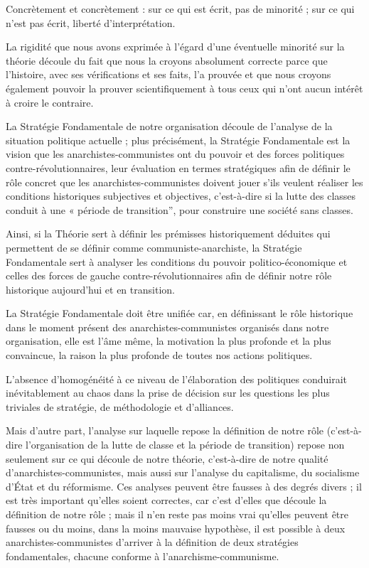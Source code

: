 Concrètement et concrètement : sur ce qui est écrit, pas de minorité ; sur ce qui n'est pas écrit, liberté d'interprétation.

La rigidité que nous avons exprimée à l'égard d'une éventuelle minorité sur la théorie découle du fait que nous la croyons absolument correcte parce que l'histoire, avec ses vérifications et ses faits, l'a prouvée et que nous croyons également pouvoir la prouver scientifiquement à tous ceux qui n'ont aucun intérêt à croire le contraire.

La Stratégie Fondamentale de notre organisation découle de l'analyse de la situation politique actuelle ; plus précisément, la Stratégie Fondamentale est la vision que les anarchistes-communistes ont du pouvoir et des forces politiques contre-révolutionnaires, leur évaluation en termes stratégiques afin de définir le rôle concret que les anarchistes-communistes doivent jouer s'ils veulent réaliser les conditions historiques subjectives et objectives, c'est-à-dire si la lutte des classes conduit à une « période de transition'', pour construire une société sans classes.

Ainsi, si la Théorie sert à définir les prémisses historiquement déduites qui permettent de se définir comme communiste-anarchiste, la Stratégie Fondamentale sert à analyser les conditions du pouvoir politico-économique et celles des forces de gauche contre-révolutionnaires afin de définir notre rôle historique aujourd'hui et en transition.

La Stratégie Fondamentale doit être unifiée car, en définissant le rôle historique dans le moment présent des anarchistes-communistes organisés dans notre organisation, elle est l'âme même, la motivation la plus profonde et la plus convaincue, la raison la plus profonde de toutes nos actions politiques.

L'absence d'homogénéité à ce niveau de l'élaboration des politiques conduirait inévitablement au chaos dans la prise de décision sur les questions les plus triviales de stratégie, de méthodologie et d'alliances.

Mais d'autre part, l'analyse sur laquelle repose la définition de notre rôle (c'est-à-dire l'organisation de la lutte de classe et la période de transition) repose non seulement sur ce qui découle de notre théorie, c'est-à-dire de notre qualité d'anarchistes-communistes, mais aussi sur l'analyse du capitalisme, du socialisme d'État et du réformisme. Ces analyses peuvent être fausses à des degrés divers ; il est très important qu'elles soient correctes, car c'est d'elles que découle la définition de notre rôle ; mais il n'en reste pas moins vrai qu'elles peuvent être fausses ou du moins, dans la moins mauvaise hypothèse, il est possible à deux anarchistes-communistes d'arriver à la définition de deux stratégies fondamentales, chacune conforme à l'anarchisme-communisme.


